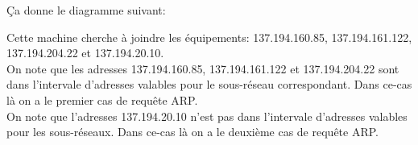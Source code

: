 \documentclass{article}
\begin{document}
\begin{exercise}
    Ça donne le diagramme suivant:
    \begin{figure}[H]
        \centering{}
    \end{figure}

    Cette machine cherche à joindre les équipements: 137.194.160.85, 137.194.161.122, 137.194.204.22 et 137.194.20.10.\\

    On note que les adresses 137.194.160.85, 137.194.161.122 et 137.194.204.22 sont dans l'intervale d'adresses valables pour le sous-réseau correspondant. Dans ce-cas là on a le premier cas de requête ARP.\\

    On note que l'adresses 137.194.20.10 n'est pas dans l'intervale d'adresses valables pour les sous-réseaux. Dans ce-cas là on a le deuxième cas de requête ARP.
\end{exercise}
\end{document}
